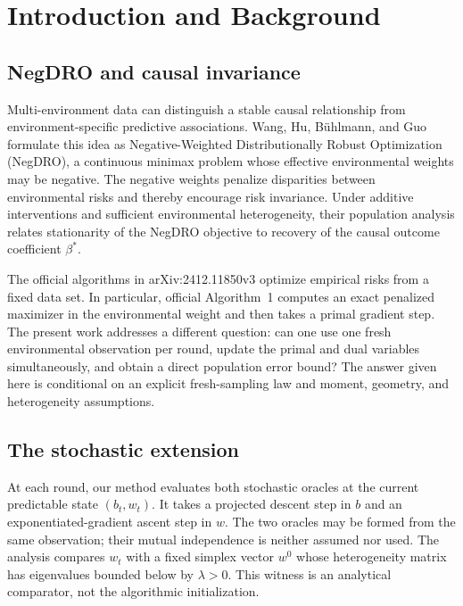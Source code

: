 \section{Introduction and Background}
\label{sec:introduction}

\subsection{NegDRO and causal invariance}

Multi-environment data can distinguish a stable causal relationship from
environment-specific predictive associations.  Wang, Hu, B\"uhlmann, and
Guo~\cite{wang2026negdro} formulate this idea as Negative-Weighted
Distributionally Robust Optimization (NegDRO), a continuous minimax problem
whose effective environmental weights may be negative.  The negative weights
penalize disparities between environmental risks and thereby encourage risk
invariance.  Under additive interventions and sufficient environmental
heterogeneity, their population analysis relates stationarity of the NegDRO
objective to recovery of the causal outcome coefficient $\beta^*$.

The official algorithms in arXiv:2412.11850v3 optimize empirical risks from a
fixed data set.  In particular, official Algorithm~1 computes an exact
penalized maximizer in the environmental weight and then takes a primal
gradient step.  The present work addresses a different question: can one use
one fresh environmental observation per round, update the primal and dual
variables simultaneously, and obtain a direct population error bound?  The
answer given here is conditional on an explicit fresh-sampling law and moment,
geometry, and heterogeneity assumptions.

\subsection{The stochastic extension}

At each round, our method evaluates both stochastic oracles at the current
predictable state $(b_t,w_t)$.  It takes a projected descent step in $b$ and an
exponentiated-gradient ascent step in $w$.  The two oracles may be formed from
the same observation; their mutual independence is neither assumed nor used.
The analysis compares $w_t$ with a fixed simplex vector $w^0$ whose
heterogeneity matrix has eigenvalues bounded below by $\lambda>0$.  This
witness is an analytical comparator, not the algorithmic initialization.

